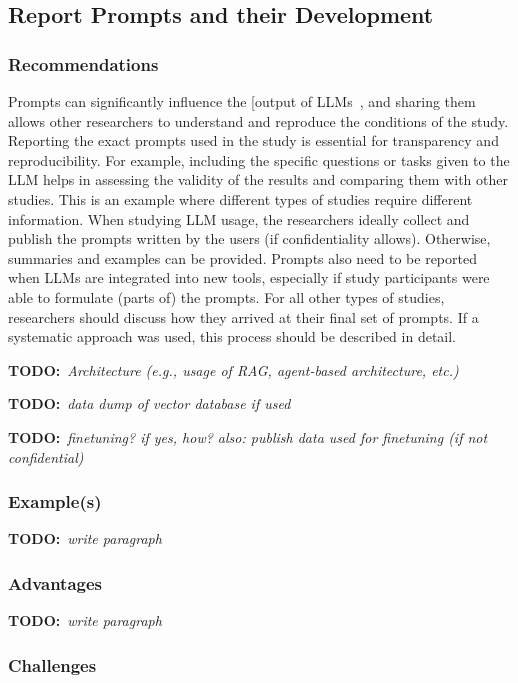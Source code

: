 \documentclass[11pt]{article}
\newcommand{\todo}[1]{{\textbf{TODO:}\ \textit{#1}}} %
\begin{document}
\subsection{Report Prompts and their Development}

\subsubsection{Recommendations}

Prompts can significantly influence the [output of LLMs~\cite{DBLP:journals/tosem/LiuLWTLLL24}, and sharing them allows other researchers to understand and reproduce the conditions of the study.
Reporting the exact prompts used in the study is essential for transparency and reproducibility.
For example, including the specific questions or tasks given to the LLM helps in assessing the validity of the results and comparing them with other studies.
This is an example where different types of studies require different information.
When studying LLM usage, the researchers ideally collect and publish the prompts written by the users (if confidentiality allows).
Otherwise, summaries and examples can be provided.
Prompts also need to be reported when LLMs are integrated into new tools, especially if study participants were able to formulate (parts of) the prompts.
For all other types of studies, researchers should discuss how they arrived at their final set of prompts.
If a systematic approach was used, this process should be described in detail.

\todo{Architecture (e.g., usage of RAG, agent-based architecture, etc.)}

\todo{data dump of vector database if used}

\todo{finetuning? if yes, how? also: publish data used for finetuning (if not confidential)}


\subsubsection{Example(s)}

\todo{write paragraph}


\subsubsection{Advantages}

\todo{write paragraph}


\subsubsection{Challenges}
\end{document}
